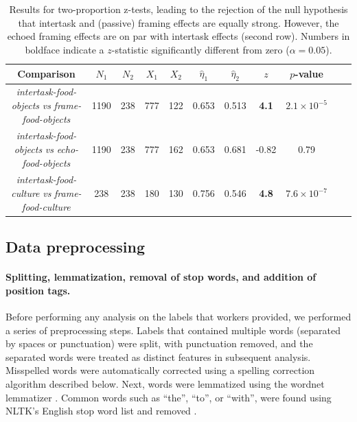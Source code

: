 \documentclass[12pt]{article}
\begin{document}
\begin{table}
\begin{center}
\begin{tabular}{c c c c c c c c c c c }
	\toprule
	Comparison & $N_1$ & $N_2$ & $X_1$ & $X_2$ & $\hat{\eta}_1$ 
		& $\hat{\eta}_2$ & $z$ & $p$-value \\ 
	\midrule
	\parbox[c]{4cm}{\textit{intertask-food-objects} 
	\textit{vs} \textit{frame-food-objects}} & 1190 & 238 & 777 & 122 &
	0.653 & 0.513 & \textbf{4.1} & $2.1 \times 10^{-5}$ \\ 

\noalign{\smallskip}
\hdashline
\noalign{\smallskip}

	\parbox[c]{4cm}{\textit{intertask-food-objects} 
	\textit{vs} \textit{echo-food-objects}} & 1190 & 238 & 777 & 162 
		& 0.653 & 0.681 & -0.82 & 0.79 \\

\noalign{\smallskip}
\hdashline
\noalign{\smallskip}

	\parbox[c]{4cm}{\textit{intertask-food-culture} 
	\textit{vs} \textit{frame-food-culture}} & 238 & 238 & 180 & 130 
	& 0.756 & 0.546 & \textbf{4.8} & $7.6 \times 10^{-7}$ \\
	\bottomrule

\end{tabular}

\caption{
	Results for two-proportion z-tests, leading to the rejection of the null 
	hypothesis that intertask and (passive) framing effects are equally 
	strong.  However, the echoed framing effects are on par with intertask
	effects (second row). 
	Numbers in boldface indicate a $z$-statistic significantly 
	different from zero ($\alpha=0.05$).
}
\label{table:intertask_framing}
\end{center}
\end{table}




\subsection*{Data preprocessing}
	\paragraph{Splitting, lemmatization, removal of stop words, and 
		addition of position tags.} 

	Before performing any analysis on the labels that workers provided, we
	performed a series of preprocessing steps.  
	Labels that contained
	multiple words (separated by spaces or punctuation) were split, with
	punctuation removed, and the separated words were treated as distinct 
	features in subsequent analysis.
	Misspelled words were automatically corrected using a spelling 
	correction algorithm described below.  
	Next, words were lemmatized using the
	wordnet lemmatizer \cite{miller1995wordnet,felbaum1998wordnet}.  
	Common words such as ``the'', ``to'', or ``with'', were found using
	NLTK's English stop word list and removed \cite{loper2002nltk}.  
\end{document}
